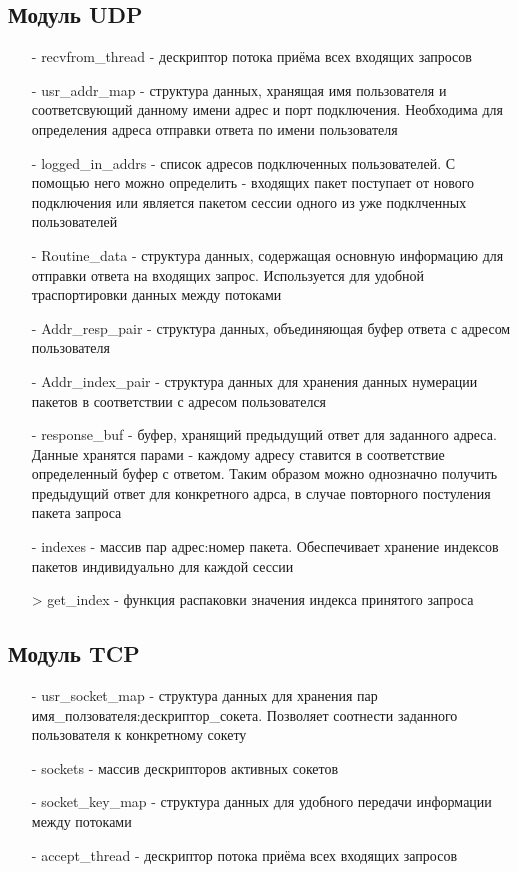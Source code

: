 \subsection{Модуль UDP}
\begin{itemize}
\item[-] recvfrom_thread - дескриптор потока приёма всех входящих запросов
\item[-] usr_addr_map - структура данных, хранящая имя пользователя и соответсвующий данному имени адрес и порт подключения. Необходима для определения адреса отправки ответа по имени пользователя
\item[-] logged_in_addrs - список адресов подключенных пользователей. С помощью него можно определить - входящих пакет поступает от нового подключения или является пакетом сессии одного из уже подклченных пользователей
\item[-] Routine_data - структура данных, содержащая основную информацию для отправки ответа на входящих запрос. Используется для удобной траспортировки данных между потоками
\item[-] Addr_resp_pair - структура данных, объединяющая буфер ответа с адресом пользователя
\item[-] Addr_index_pair - структура данных для хранения данных нумерации пакетов в соответствии с адресом пользователся 
\item[-] response_buf - буфер, хранящий предыдущий ответ для заданного адреса. Данные хранятся парами - каждому адресу ставится в соответствие определенный буфер с ответом. Таким образом можно однозначно получить предыдущий ответ для конкретного адрса, в случае повторного постуления пакета запроса
\item[-] indexes - массив пар адрес:номер пакета. Обеспечивает хранение индексов пакетов индивидуально для каждой сессии
\item[>] get_index - функция распаковки значения индекса принятого запроса
\end{itemize}

\subsection{Модуль TCP}
\begin{itemize}
\item[-] usr_socket_map - структура данных для хранения пар имя_ползователя:дескриптор_сокета. Позволяет соотнести заданного пользователя к конкретному сокету
\item[-] sockets - массив дескрипторов активных сокетов
\item[-] socket_key_map - структура данных для удобного передачи информации между потоками
\item[-] accept_thread - дескриптор потока приёма всех входящих запросов
\end{itemize}


